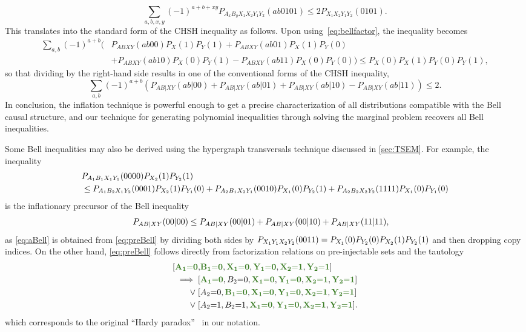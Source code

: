 {\[
	\sum_{a,b,x,y} (-1)^{a + b + xy} P_{A_x B_y X_1 X_2 Y_1 Y_2}(a b 0 1 0 1) \leq 2 P_{X_1 X_2 Y_1 Y_2}(0101).
\]
This translates into the standard form of the CHSH inequality as follows. Upon using~\cref{eq:bellfactor}, the inequality becomes
\begin{align*}
	\sum_{a,b} (-1)^{a + b} \big( & P_{A B X Y}(ab00)P_X(1)P_Y(1) + P_{A B X Y}(ab01)P_X(1)P_Y(0) \\[-4pt]
	& + P_{A B X Y}(ab10)P_X(0)P_Y(1) - P_{A B X Y}(ab11)P_X(0)P_Y(0) \big) \leq P_X(0)P_X(1)P_Y(0)P_Y(1),
\end{align*}
so that dividing by the right-hand side results in one of the conventional forms of the CHSH inequality,
\[
	\sum_{a,b} (-1)^{a + b} \left( P_{AB|XY}(ab|00) + P_{AB|XY}(ab|01) + P_{AB|XY}(ab|10) - P_{AB|XY}(ab|11) \right) \leq 2.
\]
In conclusion, the inflation technique is powerful enough to get a precise characterization of all distributions compatible with the Bell causal structure, and our technique for generating polynomial inequalities through solving the marginal problem recovers all Bell inequalities.

Some Bell inequalities may also be derived using the hypergraph transversals technique discussed in \cref{sec:TSEM}. For example, the inequality
\begin{align}\label{eq:preBell}\begin{split}
& \p[A_1 B_1 X_1 Y_1]{0000}\p[X_2]{1} \p[Y_2]{1} \\
&\leq
 \p[A_1 B_2 X_1 Y_2]{0001}\p[X_2]{1} \p[Y_1]{0} +\p[A_2 B_1 X_2 Y_1]{0010}\p[X_1]{0}\p[Y_2]{1}+  \p[A_2 B_2 X_2 Y_2]{1111}\p[X_1]{0} \p[Y_1]{0}
\end{split}\end{align}
is the inflationary precursor of the Bell inequality
\begin{align}\label{eq:aBell}
 \p[A B | X Y]{00|00} &\leq \p[A B | X Y]{00|01} +\p[A B | X Y]{00|10}+  \p[A B | X Y]{11|11},
\end{align}
as \cref{eq:aBell} is obtained from \cref{eq:preBell} by dividing both sides by $\p[X_1 Y_1 X_2 Y_2]{0011}=\p[X_1]{0} \p[Y_2]{0}\p[X_2]{1} \p[Y_2]{1}$ and then dropping copy indices. On the other hand, \cref{eq:preBell} follows directly from factorization relations on pre-injectable sets and the tautology
\begin{align}\begin{split}
	[ \mgreen{A_1 \eql 0}, & \mgreen{B_1 \eql 0}, \mgreen{X_1 \eql 0}, \mgreen{Y_1\eql 0}, \mgreen{X_2 \eql 1}, \mgreen{Y_2 \eql 1}]\\
 \implies 
	[ & \mgreen{A_1 \eql 0}, B_2 \eql 0, \mgreen{X_1 \eql 0}, \mgreen{Y_1\eql 0}, \mgreen{X_2 \eql 1}, \mgreen{Y_2 \eql 1}] \\
	\mathrel{\lor} [ & A_2 \eql 0, \mgreen{B_1 \eql 0}, \mgreen{X_1 \eql 0}, \mgreen{Y_1\eql 0}, \mgreen{X_2 \eql 1}, \mgreen{Y_2 \eql 1}] \\
	\mathrel{\lor} [ & A_2 \eql 1, B_2 \eql 1, \mgreen{X_1 \eql 0}, \mgreen{Y_1\eql 0}, \mgreen{X_2 \eql 1}, \mgreen{Y_2 \eql 1}].
\end{split}\end{align}
which corresponds to the original ``Hardy paradox''~\cite{L.Hardy:PRL:1665} in our notation.

}
